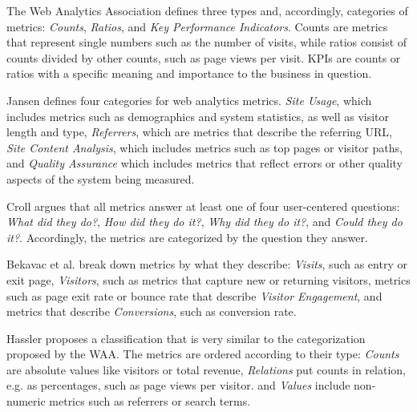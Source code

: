 
The Web Analytics Association \cite{2007Burby} defines three types and, accordingly, categories of metrics: \textit{Counts}, \textit{Ratios}, and \textit{Key Performance Indicators}.
Counts are metrics that represent single numbers such as the number of visits, while ratios consist of counts divided by other counts, such as page views per visit.
KPIs are counts or ratios with a specific meaning and importance to the business in question.

Jansen \cite{2009Jansen} defines four categories for web analytics metrics. %
\textit{Site Usage}, which includes metrics such as demographics and system statistics, as well as visitor length and type,
\textit{Referrers}, which are metrics that describe the referring URL,
\textit{Site Content Analysis}, which includes metrics such as top pages or visitor paths, and
\textit{Quality Assurance} which includes metrics that reflect errors or other quality aspects of the system being measured.


Croll \cite{2009Croll} argues that all metrics answer at least one of four user-centered questions: \textit{What did they do?}, \textit{How did they do it?}, \textit{Why did they do it?}, and \textit{Could they do it?}.
Accordingly, the metrics are categorized by the question they answer.

Bekavac et al. \cite{2015Bekavac} break down metrics by what they describe: \textit{Visits}, such as entry or exit page,
\textit{Visitors}, such as metrics that capture new or returning visitors,
metrics such as page exit rate or bounce rate that describe \textit{Visitor Engagement},
and metrics that describe \textit{Conversions}, such as conversion rate.


Hassler \cite{2017Hassler} proposes a classification that is very similar to the categorization proposed by the WAA.
The metrics are ordered according to their type:
\textit{Counts} are absolute values like visitors or total revenue,
\textit{Relations} put counts in relation, e.g. as percentages, such as page views per visitor.
and \textit{Values} include non-numeric metrics such as referrers or search terms.

